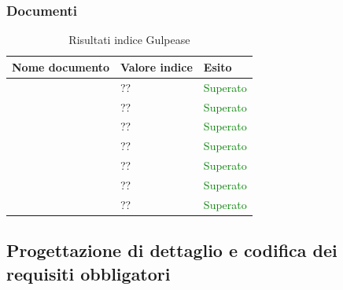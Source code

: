 	 	\subsubsection{Documenti}
		\begin{table}[!ht]
			\begin{center}
				\begin{tabularx}{0.9\textwidth}{|l|l|X|}
					\hline
					\textbf{Nome documento} & \textbf{Valore indice} & \textbf{Esito}\\
					\hline						
					\docNameVersionAdR & ?? & \textcolor{green}{Superato}\\
					\hline
					\docNameVersionGlo & ?? & \textcolor{green}{Superato}\\
					\hline					
					\docNameVersionNdP & ?? & \textcolor{green}{Superato}\\
					\hline					
					\docNameVersionPdP & ?? & \textcolor{green}{Superato}\\
					\hline					
					\docNameVersionPdQ & ?? & \textcolor{green}{Superato}\\
					\hline					
					\docNameVersionSdF & ?? & \textcolor{green}{Superato}\\
					\hline	
					\docNameVersionST & ?? & \textcolor{green}{Superato}\\
					\hline			
				\end{tabularx}
			\end{center}
			\caption{Risultati indice Gulpease}
		\end{table}
		\subsection{Progettazione di dettaglio e codifica dei requisiti obbligatori}
